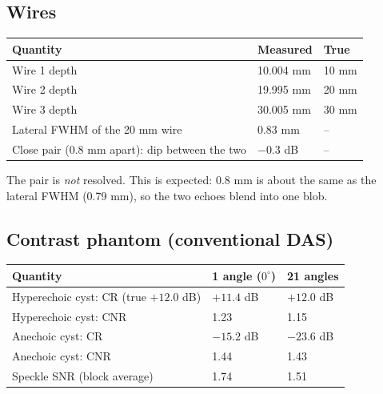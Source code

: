 \documentclass[11pt,a4paper]{article}
\begin{document}
\subsection{Wires}
\begin{center}
\begin{tabular}{@{}p{7.2cm}p{3.5cm}p{3.5cm}@{}}
\toprule
\textbf{Quantity} & \textbf{Measured} & \textbf{True}\\
\midrule
Wire 1 depth & 10.004 mm & 10 mm\\
Wire 2 depth & 19.995 mm & 20 mm\\
Wire 3 depth & 30.005 mm & 30 mm\\
Lateral FWHM of the 20 mm wire & 0.83 mm & --\\
Close pair (0.8 mm apart): dip between the two & $-0.3$ dB & --\\
\bottomrule
\end{tabular}
\end{center}
The pair is \emph{not} resolved. This is expected: 0.8 mm is about the same as the lateral FWHM (0.79 mm), so the two echoes blend into one blob.

\subsection{Contrast phantom (conventional DAS)}
\begin{center}
\begin{tabular}{@{}p{6.0cm}p{3.1cm}p{3.1cm}@{}}
\toprule
\textbf{Quantity} & \textbf{1 angle ($0^\circ$)} & \textbf{21 angles}\\
\midrule
Hyperechoic cyst: CR (true $+12.0$ dB) & $+11.4$ dB & $+12.0$ dB\\
Hyperechoic cyst: CNR & 1.23 & 1.15\\
Anechoic cyst: CR & $-15.2$ dB & $-23.6$ dB\\
Anechoic cyst: CNR & 1.44 & 1.43\\
Speckle SNR (block average) & 1.74 & 1.51\\
\bottomrule
\end{tabular}
\end{center}
\end{document}
